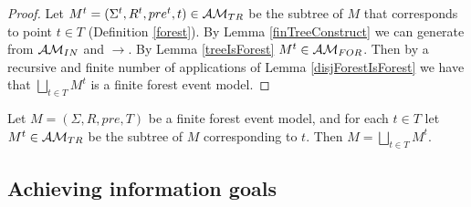 \begin{proof}
Let $M^t = (\Sigma^t, R^t, pre^t, t) \in \mathcal{AM}_{TR}$ be the
subtree of $M$ that corresponds to point $t \in T$ (Definition \ref{forest}).
By Lemma \ref{finTreeConstruct} we can generate from $\mathcal{AM}_{IN}$ and $\to$.
By Lemma \ref{treeIsForest} $M^t \in \mathcal{AM}_{FOR}$.
Then by a recursive and finite number of applications of Lemma
\ref{disjForestIsForest} we have that $\bigsqcup_{t \in T} M^t$ is a finite
forest event model.
\end{proof}

\begin{corr} \label{forestConCorr}
Let $M = (\Sigma, R, pre, T)$ be a finite forest event model, and for each $t \in T$ let $M^t \in
\mathcal{AM}_{TR}$ be the subtree of $M$ corresponding to $t$.
Then $M = \bigsqcup_{t \in T} M^t$.
\end{corr}

\subsection{Achieving information goals}


